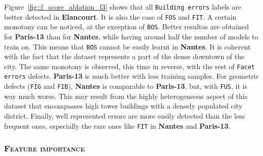             Figure~\ref{fig::f_score_ablation_f3} shows that all \texttt{Building errors} labels are better detected in \textbf{Elancourt}.
            It is also the case of \texttt{FOS} and \texttt{FIT}.
            A certain monotony can be noticed, at the exception of \texttt{BOS}.
            Better resultas are obtained for \textbf{Paris-13} than for \textbf{Nantes}, while having around half the number of models to train on.
            This means that \texttt{BOS} cannot be easily learnt in \textbf{Nantes}.
            It is coherent with the fact that the dataset represents a part of the dense downtown of the city.
            The same monotony is observed, this time in reverse, with the rest of \texttt{Facet errors} defects. \textbf{Paris-13} is much better with less training samples.
            For geometric defects (\texttt{FIG} and \texttt{FIB}), \textbf{Nantes} is comparable to \textbf{Paris-13}, but, with \texttt{FUS}, it is way much worse.
            This may result from the highly heterogeneous aspect of this dataset that encompasses high tower buildings with a densely populated city district.
            Finally, well represented errors are more easily detected than the less frequent ones, especially the rare ones like \texttt{FIT} in \textbf{Nantes} and \textbf{Paris-13}.
        
        \subsubsection{\textsc{Feature importance}}
            \label{subsubsec::experiments::evaluation::baseline_feature_analysis::feature_importance}
            \begin{figure}[htpb]
                \centering
            \end{figure}
            
